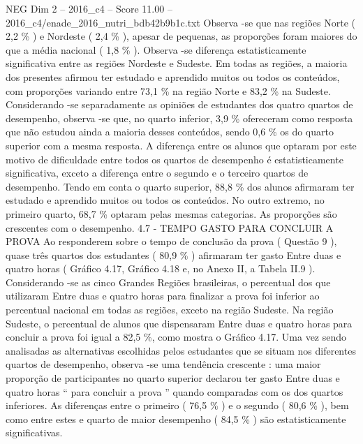 \begin{textsample}{NEG Dim 2 – 2016\_c4 – Score 11.00 – 2016\_c4/enade\_2016\_nutri\_bdb42b9b1c.txt}
Observa -se que nas regiões Norte ( 2,2 \% ) e Nordeste ( 2,4 \% ), apesar de pequenas, as proporções foram maiores do que a média nacional ( 1,8 \% ).
Observa -se diferença estatisticamente significativa entre as regiões Nordeste e Sudeste.
Em todas as regiões, a maioria dos presentes afirmou ter estudado e aprendido muitos ou todos os conteúdos, com proporções variando entre 73,1 \% na região Norte e 83,2 \% na Sudeste.
Considerando -se separadamente as opiniões de estudantes dos quatro quartos de desempenho, observa -se que, no quarto inferior, 3,9 \% ofereceram como resposta que não estudou ainda a maioria desses conteúdos, sendo 0,6 \% os do quarto superior com a mesma resposta.
A diferença entre os alunos que optaram por este motivo de dificuldade entre todos os quartos de desempenho é estatisticamente significativa, exceto a diferença entre o segundo e o terceiro quartos de desempenho.
Tendo em conta o quarto superior, 88,8 \% dos alunos afirmaram ter estudado e aprendido muitos ou todos os conteúdos.
No outro extremo, no primeiro quarto, 68,7 \% optaram pelas mesmas categorias.
As proporções são crescentes com o desempenho. 4.7 - TEMPO GASTO PARA CONCLUIR A PROVA Ao responderem sobre o tempo de conclusão da prova ( Questão 9 ), quase três quartos dos estudantes ( 80,9 \% ) afirmaram ter gasto Entre duas e quatro horas ( Gráfico 4.17, Gráfico 4.18 e, no Anexo II, a Tabela II.9 ).
Considerando -se as cinco Grandes Regiões brasileiras, o percentual dos que utilizaram Entre duas e quatro horas para finalizar a prova foi inferior ao percentual nacional em todas as regiões, exceto na região Sudeste.
Na região Sudeste, o percentual de alunos que dispensaram Entre duas e quatro horas para concluir a prova foi igual a 82,5 \%, como mostra o Gráfico 4.17.
Uma vez sendo analisadas as alternativas escolhidas pelos estudantes que se situam nos diferentes quartos de desempenho, observa -se uma tendência crescente : uma maior proporção de participantes no quarto superior declarou ter gasto Entre duas e quatro horas “ para concluir a prova ” quando comparadas com os dos quartos inferiores.
As diferenças entre o primeiro ( 76,5 \% ) e o segundo ( 80,6 \% ), bem como entre estes e quarto de maior desempenho ( 84,5 \% ) são estatisticamente significativas.

\end{textsample}
